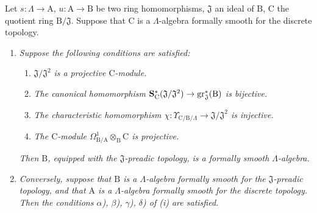 \begin{theorem}[22.1.1]
\label{0.22.1.1}
Let $s:\Lambda\to\mathrm{A}$, $u:\mathrm{A}\to\mathrm{B}$ be two ring homomorphisms, $\mathfrak{J}$ an ideal of $\mathrm{B}$, $\mathrm{C}$ the quotient ring $\mathrm{B}/\mathfrak{J}$.
Suppose that $\mathrm{C}$ is a $\Lambda$-algebra formally smooth for the discrete topology.
\begin{enumerate}
  \item[\rm{(i)}] \emph{Suppose the following conditions are satisfied:}
  \begin{enumerate}
    \item[$\alpha$)] $\mathfrak{J}/\mathfrak{J}^2$ \emph{is a projective $\mathrm{C}$-module.}
    \item[$\beta$)] \emph{The canonical homomorphism $\mathbf{S}^*_\mathrm{C}(\mathfrak{J}/\mathfrak{J}^2)\to\operatorname{gr}^*_\mathfrak{J}(\mathrm{B})$  is bijective.}
    \item[$\gamma$)] \emph{The characteristic homomorphism $\chi:\Upsilon_{\mathrm{C}/\mathrm{B}/\Lambda}\to\mathfrak{J}/\mathfrak{J}^2$  is injective.}
    \item[$\delta$)] \emph{The $\mathrm{C}$-module $\Omega^1_{\mathrm{B}/\mathrm{A}}\otimes_\mathrm{B}\mathrm{C}$ is projective.}
  \end{enumerate}
  \emph{Then $\mathrm{B}$, equipped with the $\mathfrak{J}$-preadic topology, is a formally smooth $\Lambda$-algebra.}
  \item[\rm{(ii)}] \emph{Conversely, suppose that $\mathrm{B}$ is a $\Lambda$-algebra formally smooth for the $\mathfrak{J}$-preadic topology, and that $\mathrm{A}$ is a $\Lambda$-algebra formally smooth for the discrete topology.
  Then the conditions $\alpha$), $\beta$), $\gamma$), $\delta$) of \rm{(i)} are satisfied.}
\end{enumerate}
\end{theorem}

